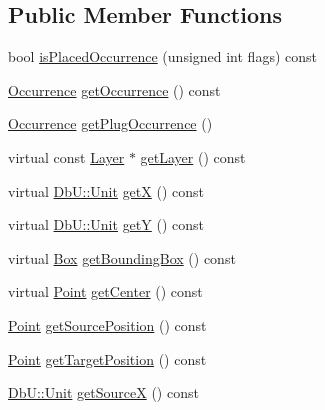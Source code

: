 \subsection*{Public Member Functions}
\begin{DoxyCompactItemize}
\item 
bool \mbox{\hyperlink{classHurricane_1_1RoutingPad_a3e94730dded06e5953087755f0551b73}{is\+Placed\+Occurrence}} (unsigned int flags) const
\item 
\mbox{\hyperlink{classHurricane_1_1Occurrence}{Occurrence}} \mbox{\hyperlink{classHurricane_1_1RoutingPad_a2767550364ef01c772f3270850ec052f}{get\+Occurrence}} () const
\item 
\mbox{\hyperlink{classHurricane_1_1Occurrence}{Occurrence}} \mbox{\hyperlink{classHurricane_1_1RoutingPad_a30190c50577ce47727dec11f5423a85b}{get\+Plug\+Occurrence}} ()
\item 
virtual const \mbox{\hyperlink{classHurricane_1_1Layer}{Layer}} $\ast$ \mbox{\hyperlink{classHurricane_1_1RoutingPad_a7f1e300e4148556fa223e623738d79d4}{get\+Layer}} () const
\item 
virtual \mbox{\hyperlink{group__DbUGroup_ga4fbfa3e8c89347af76c9628ea06c4146}{Db\+U\+::\+Unit}} \mbox{\hyperlink{classHurricane_1_1RoutingPad_a5c9c00c648bd0d24e1a8b0876ab442df}{getX}} () const
\item 
virtual \mbox{\hyperlink{group__DbUGroup_ga4fbfa3e8c89347af76c9628ea06c4146}{Db\+U\+::\+Unit}} \mbox{\hyperlink{classHurricane_1_1RoutingPad_aede4c04a7f893b1e5478b164b6eaae2d}{getY}} () const
\item 
virtual \mbox{\hyperlink{classHurricane_1_1Box}{Box}} \mbox{\hyperlink{classHurricane_1_1RoutingPad_a2cc2894b5e1c82b725dedcf1978dc773}{get\+Bounding\+Box}} () const
\item 
virtual \mbox{\hyperlink{classHurricane_1_1Point}{Point}} \mbox{\hyperlink{classHurricane_1_1RoutingPad_ad254b92749146a0eaaa7ed8f33fac4da}{get\+Center}} () const
\item 
\mbox{\hyperlink{classHurricane_1_1Point}{Point}} \mbox{\hyperlink{classHurricane_1_1RoutingPad_acc706fecb615230387a73ed8a7384c8e}{get\+Source\+Position}} () const
\item 
\mbox{\hyperlink{classHurricane_1_1Point}{Point}} \mbox{\hyperlink{classHurricane_1_1RoutingPad_a8de215adabb4a3330d02339c38dd6d4b}{get\+Target\+Position}} () const
\item 
\mbox{\hyperlink{group__DbUGroup_ga4fbfa3e8c89347af76c9628ea06c4146}{Db\+U\+::\+Unit}} \mbox{\hyperlink{classHurricane_1_1RoutingPad_ae80e8f84f5806582905f6695f5cc43df}{get\+SourceX}} () const

\end{DoxyCompactItemize}
